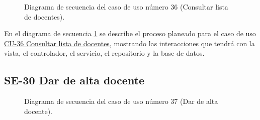 \begin{figure}[htbp!]
	\begin{center}
		\caption{Diagrama de secuencia del caso de uso número 36 (Consultar lista de docentes).}
		\label{fig:Diagrama de secuencia CU-36}
	\end{center}
\end{figure}

En el diagrama de secuencia \ref{fig:Diagrama de secuencia CU-36} se describe el proceso planeado para el caso de uso \hyperlink{CU-36}{CU-36 Consultar lista de docentes}, mostrando las interacciones que tendrá con la vista, el controlador, el servicio, el repositorio y la base de datos.

\newpage

\subsection{SE-30 Dar de alta docente}

\begin{figure}[htbp!]
	\begin{center}
		\caption{Diagrama de secuencia del caso de uso número 37 (Dar de alta docente).}
		\label{fig:Diagrama de secuencia CU-37}
	\end{center}
\end{figure}

